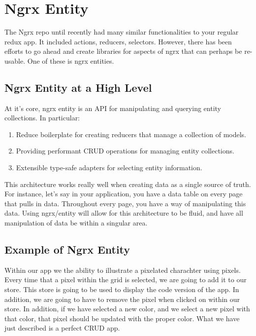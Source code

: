 \maketitle{}
\section{ Ngrx Entity }

The Ngrx repo until recently had many similar functionalities to your regular
redux app. It included actions, reducers, selectors. However, there has been
efforts to go ahead and create libraries for aspects of ngrx that can perhaps
be re-usable. One of these is ngrx entities.

\subsection{ Ngrx Entity at a High Level }
At it's core, ngrx entity is an API for manipulating and querying entity
collections. In particular:
\begin{enumerate}
  \item Reduce boilerplate for creating reducers that manage a collection of
  models.
  \item Providing performant CRUD operations for managing entity collections.
  \item Extensible type-safe adapters for selecting entity information.
\end{enumerate}

This architecture works really well when creating data as a single source of
truth. For instance, let's say in your application, you have a data table on
every page that pulls in data. Throughout every page, you have a way of
manipulating this data. Using ngrx/entity will allow for this architecture to
be fluid, and have all manipulation of data be within a singular area.

\subsection{ Example of Ngrx Entity }
Within our app we the ability to illustrate a pixelated charachter using pixels.
Every time that a pixel within the grid is selected, we are going to add it to
our store. This store is going to be used to display the code version of the
app. In addition, we are going to have to remove the pixel when clicked on
within our store. In addition, if we have selected a new color, and we select a
new pixel with that color, that pixel should be updated with the proper color.
What we have just described is a perfect CRUD app.

